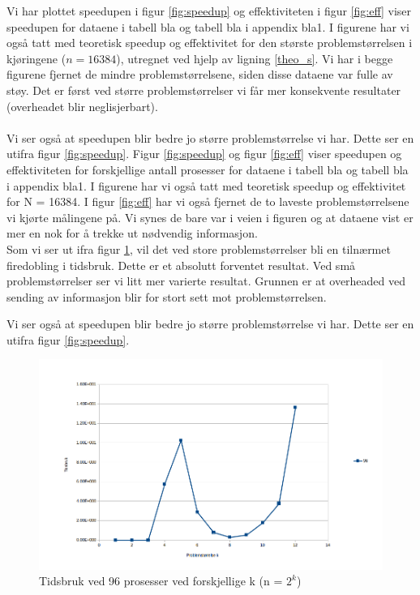 \documentclass{article}
\begin{document}
Vi har plottet speedupen i figur \ref{fig:speedup} og effektiviteten i figur \ref{fig:eff} viser speedupen for dataene i tabell bla og tabell bla i appendix bla1. I figurene har vi også tatt med teoretisk speedup og effektivitet for den største problemstørrelsen i kjøringene ($n = 16384$), utregnet ved hjelp av ligning \ref{theo_s}. Vi har i begge figurene fjernet de mindre problemstørrelsene, siden disse dataene var fulle av støy. Det er først ved større problemstørrelser vi får mer konsekvente resultater (overheadet blir neglisjerbart).\\
\\
Vi ser også at speedupen blir bedre jo større problemstørrelse vi har. Dette ser en utifra figur \ref{fig:speedup}.
Figur \ref{fig:speedup} og figur \ref{fig:eff} viser speedupen og effektiviteten for forskjellige antall prosesser for dataene i tabell bla og tabell bla i appendix bla1. I figurene har vi også tatt med teoretisk speedup og effektivitet for N = 16384. I figur \ref{fig:eff} har vi også fjernet de to laveste problemstørrelsene vi kjørte målingene på. Vi synes de bare var i veien i figuren og at dataene vist er mer en nok for å trekke ut nødvendig informasjon. \\


Som vi ser ut ifra figur \ref{fig:p96}, vil det ved store problemstørrelser bli en tilnærmet firedobling i tidsbruk. Dette er et absolutt forventet resultat. Ved små problemstørrelser ser vi litt mer varierte resultat. Grunnen er at overheaded ved sending av informasjon blir for stort sett mot problemstørrelsen. 

Vi ser også at speedupen blir bedre jo større problemstørrelse vi har. Dette ser en utifra figur \ref{fig:speedup}.



\begin{figure}[t]
	\centering
	\includegraphics[width=12cm]{img/time_p_96.png}
	\caption{Tidsbruk ved 96 prosesser ved forskjellige k (n = $2^{k}$)}		
	\label{fig:p96}
\end{figure}
\end{document}
